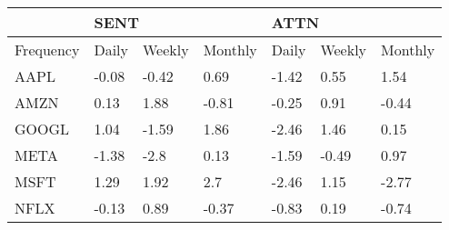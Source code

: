 \begin{tabular}{lllllll}
\toprule
{} & \multicolumn{3}{l}{SENT} & \multicolumn{3}{l}{ATTN} \\
\midrule
Frequency &  Daily &  Weekly &  Monthly &  Daily &  Weekly &  Monthly \\
AAPL      &  -0.08 &   -0.42 &     0.69 &  -1.42 &    0.55 &     1.54 \\
AMZN      &   0.13 &    1.88 &    -0.81 &  -0.25 &    0.91 &    -0.44 \\
GOOGL     &   1.04 &   -1.59 &     1.86 &  -2.46 &    1.46 &     0.15 \\
META      &  -1.38 &    -2.8 &     0.13 &  -1.59 &   -0.49 &     0.97 \\
MSFT      &   1.29 &    1.92 &      2.7 &  -2.46 &    1.15 &    -2.77 \\
NFLX      &  -0.13 &    0.89 &    -0.37 &  -0.83 &    0.19 &    -0.74 \\
\bottomrule
\end{tabular}
